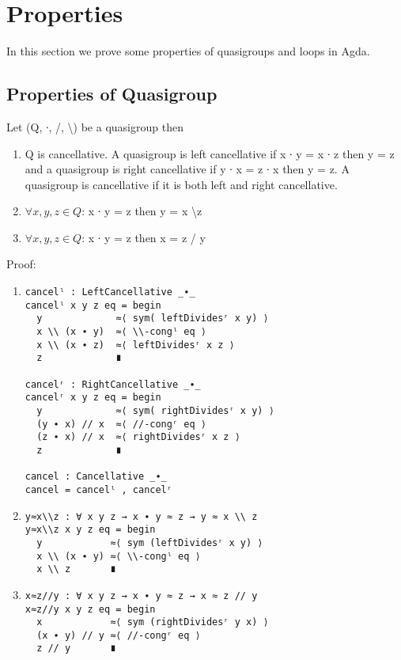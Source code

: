 \section{Properties}
In this section we prove some properties of quasigroups and loops in
Agda.
\subsection{Properties of Quasigroup}
Let (Q, ∙, /, \textbackslash ) be a quasigroup then \\
\begin{enumerate}
\item Q is cancellative. A quasigroup is left cancellative if x ∙ y = x ∙ z then
y = z and a quasigroup is right cancellative if y ∙ x = z ∙ x then y = z. A
quasigroup is cancellative if it is both left and right cancellative.
\item \(\forall x, y, z \in Q\): x ∙ y = z then y = x \textbackslash z
\item \(\forall x, y, z \in Q\): x ∙ y = z then x = z / y
\end{enumerate}
Proof:
\begin{enumerate}
\item 
\begin{verbatim}
cancelˡ : LeftCancellative _∙_
cancelˡ x y z eq = begin
  y             ≈⟨ sym( leftDividesʳ x y) ⟩
  x \\ (x ∙ y)  ≈⟨ \\-congˡ eq ⟩
  x \\ (x ∙ z)  ≈⟨ leftDividesʳ x z ⟩
  z             ∎

cancelʳ : RightCancellative _∙_
cancelʳ x y z eq = begin
  y             ≈⟨ sym( rightDividesʳ x y) ⟩
  (y ∙ x) // x  ≈⟨ //-congʳ eq ⟩
  (z ∙ x) // x  ≈⟨ rightDividesʳ x z ⟩
  z             ∎

cancel : Cancellative _∙_
cancel = cancelˡ , cancelʳ
\end{verbatim}

\item 
\begin{verbatim}
y≈x\\z : ∀ x y z → x ∙ y ≈ z → y ≈ x \\ z
y≈x\\z x y z eq = begin
  y            ≈⟨ sym (leftDividesʳ x y) ⟩
  x \\ (x ∙ y) ≈⟨ \\-congˡ eq ⟩
  x \\ z       ∎
\end{verbatim}

\item 
\begin{verbatim}
x≈z//y : ∀ x y z → x ∙ y ≈ z → x ≈ z // y
x≈z//y x y z eq = begin
  x            ≈⟨ sym (rightDividesʳ y x) ⟩
  (x ∙ y) // y ≈⟨ //-congʳ eq ⟩
  z // y       ∎
\end{verbatim}
\end{enumerate}

